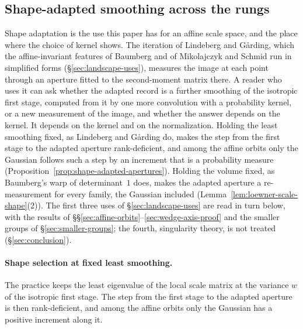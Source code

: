 
\subsection{Shape-adapted smoothing across the rungs}\label{sec:shape-adapted}

Shape adaptation is the use this paper has for an affine scale space, and the place where the choice
of kernel shows. The iteration of Lindeberg and G\aa{}rding, which the affine-invariant features of
Baumberg and of Mikolajczyk and Schmid run in simplified forms (\S\ref{sec:landscape-uses}), measures
the image at each point through an aperture fitted to the second-moment matrix there. A reader who
uses it can ask whether the adapted record is a further smoothing of the isotropic first stage,
computed from it by one more convolution with a probability kernel, or a new measurement of the image,
and whether the answer depends on the kernel. It depends on the kernel and on the normalization.
Holding the least smoothing fixed, as Lindeberg and G\aa{}rding do, makes the step from the first
stage to the adapted aperture rank-deficient, and among the affine orbits only the Gaussian follows
such a step by an increment that is a probability measure
(Proposition~\ref{prop:shape-adapted-apertures}). Holding the volume fixed, as Baumberg's warp of
determinant~$1$ does, makes the adapted aperture a re-measurement for every family, the Gaussian
included (Lemma~\ref{lem:loewner-scale-shape}(2)). The first three uses of
\S\ref{sec:landscape-uses} are read in turn below, with the results of
\S\S\ref{sec:affine-orbits}--\ref{sec:wedge-axis-proof} and the smaller groups of
\S\ref{sec:smaller-groups}; the fourth, singularity theory, is not treated (\S\ref{sec:conclusion}).

\paragraph{Shape selection at fixed least smoothing.} The practice keeps the least eigenvalue of the
local scale matrix at the variance $w$ of the isotropic first stage. The step from the first stage to the
adapted aperture is then rank-deficient, and among the affine orbits only the Gaussian has a positive
increment along it.


